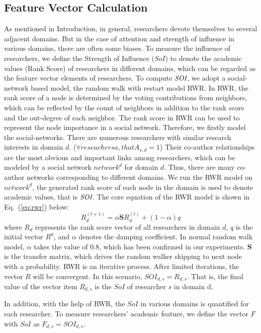 \documentclass[10pt,letterpaper]{article}
\begin{document}
\subsection*{Feature Vector Calculation}
As mentioned in Introduction, in general, researchers devote themselves to several adjacent domains. But in the case of attention and strength of influence in various domains, there are often some biases. To measure the influence of researchers, we define the Strength of Influence ($SoI$) to denote the academic values (Rank Score) of researchers in different domains, which can be regarded as the feature vector elements of researchers. To compute $\emph{SOI}$, we adopt a social-network based model, the random walk with restart model RWR. In RWR, the rank score of a node is determined by the voting contributions from neighbors, which can be reflected by the count of neighbors in addition to the rank score and the out-degree of each neighbor. The rank score in RWR can be used to represent the node importance in a social network. Therefore, we firstly model the social-networks. There are numerous researchers with similar research interests in domain $d$. ($\forall reseachers a, that A_{s,d}=1$) Their co-author relationships are the most obvious and important links among researchers, which can be modeled by a social network $network^d$ for domain $d$. Thus, there are many co-author networks corresponding to different domains. We run the RWR model on $network^d$, the generated rank score of each node in the domain is used to denote academic values, that is $\emph{SOI}$. The core equation of the RWR model is shown in Eq.~(\ref{eq:rwr}) below:
\begin{equation}\label{eq:rwr}
R_{d}^{(t+1)}=\alpha \mathbf{S}R_{d}^{(t)}+(1-\alpha)q
\end{equation}
where $R_{d}$ represents the rank score vector of all researchers in domain $d$, $q$ is the initial vector $R^0$, and $\alpha$ denotes the damping coefficient. In normal random walk model, $\alpha$ takes the value of 0.8, which has been confirmed in our experiments. $\mathbf{S}$ is the transfer matrix, which drives the random walker skipping to next node with a probability. RWR is an iterative process. After limited iterations, the vector $R$ will be convergent. In this scenario, $SOI_{d,s}=R_{d,s}$. That is, the final value of the vector item $R_{d,s}$ is the $SoI$ of researcher $s$ in domain d.

In addition, with the help of RWR, the $SoI$ in various domains is quantified for each researcher. To measure researchers' academic feature, we define the vector $F$ with $SoI$ as $F_{d,s}=SOI_{d,s}$.
\end{document}
